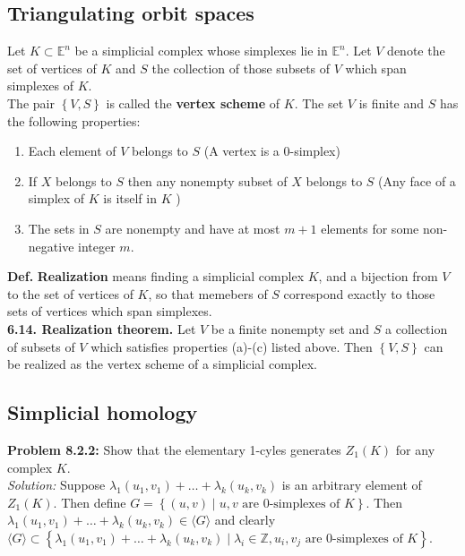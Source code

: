 \documentclass[a4paper]{article}
\begin{document}
\subsection*{Triangulating orbit spaces}
Let $K \subset \mathbb{E}^{n}$ be a simplicial complex whose simplexes lie in
$\mathbb{E}^{n}$. Let $V$ denote the set of vertices of $K$ and
$S$ the collection of those subsets of $V$ which span simplexes of $K$.\\
The pair $\left\{ V, S \right\} $ is called the \textbf{vertex scheme} of 
$K$. The set $V$ is finite and $S$ has the following properties:
\begin{enumerate}
    \item Each element of $V$ belongs to $S$ (A vertex is a $0$-simplex)
    \item If $X$ belongs to $S$ then any nonempty subset of $X$ belongs to 
        $S$ (Any face of a simplex of $K$ is itself in $K$ )
    \item The sets in $S$ are nonempty and have at most $m+1$ elements for some
        non-negative integer $m$.
\end{enumerate}
\textbf{Def.} \textbf{Realization} means finding a simplicial complex $K$, and
a bijection from $V$ to the set of vertices of $K$, so that memebers of $S$
correspond exactly to those sets of vertices which span simplexes.\\
\linebreak
\textbf{6.14. Realization theorem.} Let $V$ be a finite nonempty set
and $S$ a collection of subsets of $V$ which satisfies properties
(a)-(c) listed above. Then $\left\{ V,S \right\} $ can be realized as the
vertex scheme of a simplicial complex.\\
\linebreak



\subsection*{Simplicial homology}
\textbf{Problem 8.2.2:} Show that the elementary 1-cyles generates
$Z_1(K)$ for any complex $K$.\\
\linebreak
\textit{Solution:} Suppose
$\lambda_1 (u_1, v_1) + \ldots + \lambda_k (u_k, v_k)$ is an arbitrary element
of $Z_1(K)$. Then define
$G = \left\{ 
(u,v)  \mid u,v \text{ are 0-simplexes of }K \right\} $.
Then $\lambda_1 (u_1, v_1)
+ \ldots + \lambda_k (u_k, v_k) \in 
\langle G \rangle $ and clearly
$\langle G \rangle \subset 
\left\{ 
\lambda_1 (u_1, v_1) + \ldots + 
\lambda_k (u_k, v_k)  \mid 
\lambda_i \in \mathbb{Z}, u_i,v_j \text{ are 0-simplexes of }K \right\} $.
\end{document}
